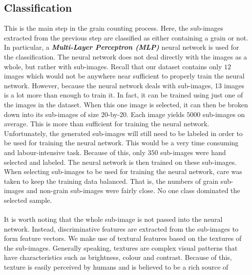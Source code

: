 \subsection{Classification}
This is the main step in the grain counting process. Here, the sub-images extracted from the previous step are classified as either containing a grain or not. In particular, a \textit{\textbf{Multi-Layer Perceptron (MLP)}} neural network is used for the classification. The neural network does not deal directly with the images as a whole, but rather with sub-images. Recall that our dataset contains only $12$ images which would not be anywhere near sufficient to properly train the neural network. However, because the neural network deals with sub-images, 13 images is a lot more than enough to train it. In fact, it can be trained using just one of the images in the dataset. When this one image is selected, it can then be broken down into its sub-images of size $20$-by-$20$. Each image yields $5000$ sub-images on average. This is more than sufficient for training the neural network. Unfortunately, the generated sub-images will still need to be labeled in order to be used for training the neural network. This would be a very time consuming and labour-intensive task. Because of this, only $350$ sub-images were hand selected and labeled. The neural network is then trained on these sub-images. When selecting sub-images to be used for training the neural network, care was taken to keep the training data balanced. That is, the numbers of grain sub-images and non-grain sub-images were fairly close. No one class dominated the selected sample.\\ \\
%
It is worth noting that the whole sub-image is not passed into the neural network. Instead, discriminative features are extracted from the sub-images to form feature vectors. We make use of textural features based on the textures of the sub-images. Generally speaking, textures are complex visual patterns that have characteristics such as brightness, colour and contrast. Because of this, texture is easily perceived by humans and is believed to be a rich source of
